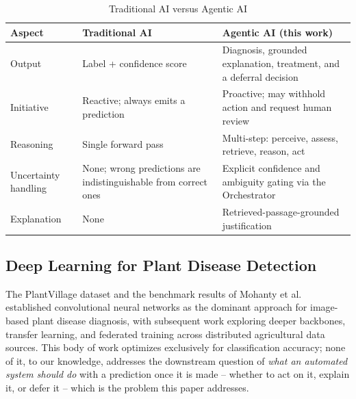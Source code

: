 \documentclass[conference]{IEEEtran}
\begin{document}
\begin{table}[t]
\centering
\caption{Traditional AI versus Agentic AI}
\label{tab:comparison}
\small
\begin{tabular}{p{1.6cm}p{2.7cm}p{2.9cm}}
\toprule
\textbf{Aspect} & \textbf{Traditional AI} & \textbf{Agentic AI (this work)} \\
\midrule
Output & Label + confidence score & Diagnosis, grounded explanation, treatment, and a deferral decision \\
Initiative & Reactive; always emits a prediction & Proactive; may withhold action and request human review \\
Reasoning & Single forward pass & Multi-step: perceive, assess, retrieve, reason, act \\
Uncertainty handling & None; wrong predictions are indistinguishable from correct ones & Explicit confidence and ambiguity gating via the Orchestrator \\
Explanation & None & Retrieved-passage-grounded justification \\
\bottomrule
\end{tabular}
\end{table}

\subsection{Deep Learning for Plant Disease Detection}
The PlantVillage dataset \cite{r_hughes2015} and the benchmark results of Mohanty et al.\ \cite{r_mohanty2016} established convolutional neural networks as the dominant approach for image-based plant disease diagnosis, with subsequent work exploring deeper backbones, transfer learning, and federated training \cite{r_fedavg} across distributed agricultural data sources. This body of work optimizes exclusively for classification accuracy; none of it, to our knowledge, addresses the downstream question of \emph{what an automated system should do} with a prediction once it is made -- whether to act on it, explain it, or defer it -- which is the problem this paper addresses.
\end{document}
